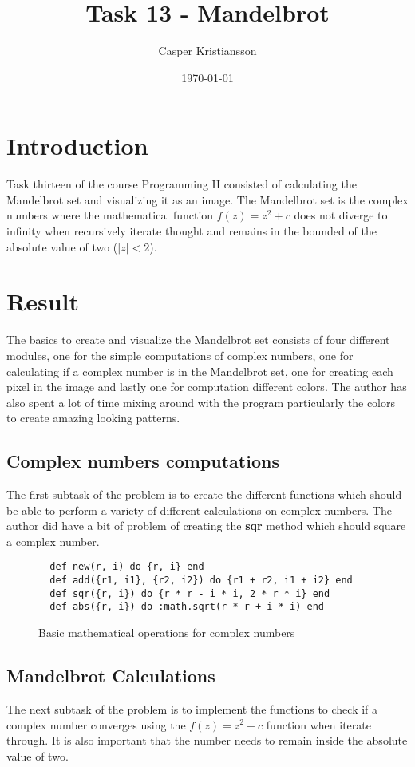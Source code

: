 \documentclass[a4paper,11pt]{article}
\begin{document}
\title{
    \textbf{Task 13 - Mandelbrot}
}
\author{Casper Kristiansson}
\date{\today}
\maketitle

\section*{Introduction}
Task thirteen of the course Programming II consisted of calculating the Mandelbrot set and visualizing it as an image. The Mandelbrot set is the complex numbers where the mathematical function $ f(z) = z^2 + c $ does not diverge to infinity when recursively iterate thought and remains in the bounded of the absolute value of two ($ |z| < 2 $).

\section*{Result}
The basics to create and visualize the Mandelbrot set consists of four different modules, one for the simple computations of complex numbers, one for calculating if a complex number is in the Mandelbrot set, one for creating each pixel in the image and lastly one for computation different colors. The author has also spent a lot of time mixing around with the program particularly the colors to create amazing looking patterns.

\subsection*{Complex numbers computations}
The first subtask of the problem is to create the different functions which should be able to perform a variety of different calculations on complex numbers. The author did have a bit of problem of creating the \textbf{sqr} method which should square a complex number.

\begin{figure}[H]
\begin{verbatim}
  def new(r, i) do {r, i} end
  def add({r1, i1}, {r2, i2}) do {r1 + r2, i1 + i2} end
  def sqr({r, i}) do {r * r - i * i, 2 * r * i} end
  def abs({r, i}) do :math.sqrt(r * r + i * i) end
\end{verbatim}
\caption{Basic mathematical operations for complex numbers}
\label{Figure:1}
\end{figure}

\subsection*{Mandelbrot Calculations}
The next subtask of the problem is to implement the functions to check if a complex number converges using the $ f(z) = z^2 + c $ function when iterate through. It is also important that the number needs to remain inside the absolute value of two.
\end{document}
